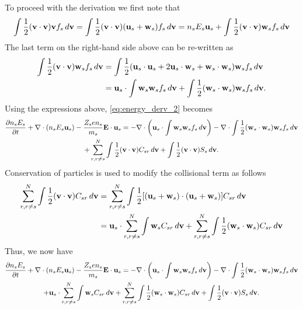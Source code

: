 \documentclass[a4paper,11pt]{report}
\begin{document}
To proceed with the derivation we first note that
\begin{multline}
\int \frac{1}{2} (\mathbf{v} \cdot \mathbf{v}) \mathbf{v} f_s \, d\mathbf{v} = \int \frac{1}{2} (\mathbf{v} \cdot \mathbf{v}) (\mathbf{u}_s + \mathbf{w}_s) f_s \, d\mathbf{v} = n_s E_s \mathbf{u}_s + \int \frac{1}{2} (\mathbf{v} \cdot \mathbf{v} ) \mathbf{w}_s f_s \, d\mathbf{v}
\end{multline}
The last term on the right-hand side above can be re-written as
\begin{align}
\int \frac{1}{2} ( \mathbf{v} \cdot \mathbf{v} ) \mathbf{w}_s f_s \, d\mathbf{v} &= \int \frac{1}{2} ( \mathbf{u}_s \cdot \mathbf{u}_s + 2\mathbf{u}_s \cdot \mathbf{w}_s + \mathbf{w}_s \cdot \mathbf{w}_s ) \mathbf{w}_s f_s \, d\mathbf{v} \\
& =  \mathbf{u}_s \cdot \int \mathbf{w}_s \mathbf{w}_s f_s \, d\mathbf{v} + \int \frac{1}{2} ( \mathbf{w}_s \cdot \mathbf{w}_s ) \mathbf{w}_s f_s \, d\mathbf{v}.
\end{align}
Using the expressions above, \cref{eq:energy_derv_2} becomes
\begin{multline}
\label{eq:energy_derv_3}
\frac{\partial n_s E_s}{\partial t} + \nabla \cdot (n_s E_s \mathbf{u}_s ) - \frac{Z_s e n_s}{m_s} \mathbf{E} \cdot \mathbf{u}_s =  - \nabla \cdot \left ( \mathbf{u}_s \cdot \int \mathbf{w}_s \mathbf{w}_s f_s \, d\mathbf{v} \right ) - \nabla \cdot \int \frac{1}{2} ( \mathbf{w}_s \cdot \mathbf{w}_s ) \mathbf{w}_s f_s \, d\mathbf{v}\\
+ \sum_{r, r \ne s}^N \int \frac{1}{2} (\mathbf{v} \cdot \mathbf{v}) C_{s r} \, d\mathbf{v} + \int \frac{1}{2} (\mathbf{v} \cdot \mathbf{v}) S_s \, d\mathbf{v}.
\end{multline}
Conservation of particles is used to modify the collisional term as follows
\begin{align}
    \label{eq:energy_collision_expansion}
    \sum_{r,r \ne s}^N \int \frac{1}{2} (\mathbf{v} \cdot \mathbf{v}) C_{s r} \, d\mathbf{v} 
    &= \sum_{r,r \ne s}^N \int \frac{1}{2} [ (\mathbf{u}_s + \mathbf{w}_s) \cdot (\mathbf{u}_s + \mathbf{w}_s)] C_{s r} \, d\mathbf{v} \nonumber \\
    &= \mathbf{u}_s \cdot  \sum_{r,r \ne s}^N \int \mathbf{w}_s C_{s r} \, d\mathbf{v} + \sum_{r,r \ne s}^N \int \frac{1}{2} (\mathbf{w}_s \cdot \mathbf{w}_s) C_{s r} \, d\mathbf{v} 
\end{align}
Thus, we now have
\begin{multline}
\label{eq:energy_derv_4}
\frac{\partial n_s E_s}{\partial t} + \nabla \cdot (n_s E_s \mathbf{u}_s ) - \frac{Z_s e n_s}{m_s} \mathbf{E} \cdot \mathbf{u}_s = - \nabla \cdot \left ( \mathbf{u}_s \cdot \int \mathbf{w}_s \mathbf{w}_s f_s \, d\mathbf{v}  \right ) - \nabla \cdot \int \frac{1}{2} ( \mathbf{w}_s \cdot \mathbf{w}_s ) \mathbf{w}_s f_s \, d\mathbf{v} \\
+ \mathbf{u}_s \cdot \sum_{r,r \ne s}^N \int \mathbf{w}_s C_{s r} \, d\mathbf{v} + \sum_{r, r \ne s}^N \int \frac{1}{2} (\mathbf{w}_s \cdot \mathbf{w}_s) C_{s r} \, d\mathbf{v} + \int \frac{1}{2} (\mathbf{v} \cdot \mathbf{v}) S_s \, d\mathbf{v}.
\end{multline}
\end{document}
